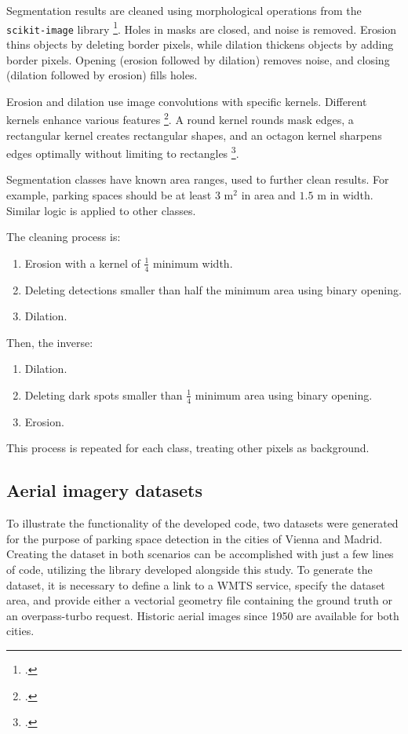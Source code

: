 \begin{refsection}
Segmentation results are cleaned using morphological operations from the \texttt{scikit-image} library \footcite{van_der_walt_scikit-image_2014}. Holes in masks are closed, and noise is removed. Erosion thins objects by deleting border pixels, while dilation thickens objects by adding border pixels. Opening (erosion followed by dilation) removes noise, and closing (dilation followed by erosion) fills holes.

Erosion and dilation use image convolutions with specific kernels. Different kernels enhance various features \footcite{jamil_noise_2008, serra_introduction_1986}. A round kernel rounds mask edges, a rectangular kernel creates rectangular shapes, and an octagon kernel sharpens edges optimally without limiting to rectangles \footcite{srisha_morphological_2013}.

Segmentation classes have known area ranges, used to further clean results. For example, parking spaces should be at least $3 \text{ m}^2$ in area and $1.5 \text{ m}$ in width. Similar logic is applied to other classes.

The cleaning process is:

\begin{enumerate}
\item Erosion with a kernel of $\frac{1}{4}$ minimum width.
\item Deleting detections smaller than half the minimum area using binary opening.
\item Dilation.
\end{enumerate}

Then, the inverse:

\begin{enumerate}
\item Dilation.
\item Deleting dark spots smaller than $\frac{1}{4}$ minimum area using binary opening.
\item Erosion.
\end{enumerate}

This process is repeated for each class, treating other pixels as background.

\subsection{Aerial imagery datasets}

To illustrate the functionality of the developed code, two datasets were generated 
for the purpose of parking space detection in the cities of Vienna and Madrid. 
Creating the dataset in both scenarios can be accomplished with just a few 
lines of code, utilizing the library developed alongside this study. 
To generate the dataset, it is necessary to define a link to a WMTS 
service, specify the dataset area, and provide either a vectorial 
geometry file containing the ground truth or an overpass-turbo request. Historic aerial images since 1950 are  available for both cities.


\end{refsection}
